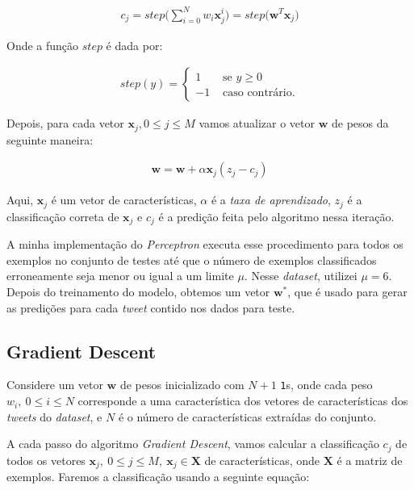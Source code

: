 \documentclass[a4paper, 12pt]{article}
\begin{document}
\begin{align*}
    c_j = step\bigg(\sum_{i = 0}^{N}{w_i\boldsymbol{x}_{j}^{i}}\bigg) = step\bigg(\boldsymbol{w}^{T}\boldsymbol{x}_j\bigg)
\end{align*}

Onde a função $step$ é dada por:

\begin{align*}
    step(y) = \begin{cases}
        1 & \text{ se } y \geq 0 \\
        -1 & \text{ caso contrário.}
    \end{cases}
\end{align*}

Depois, para cada vetor $\boldsymbol{x}_j, 0 \leq j \leq M$ vamos atualizar o vetor
$\boldsymbol{w}$ de pesos da seguinte maneira:

\begin{align*}
    \boldsymbol{w} = \boldsymbol{w} + \alpha\boldsymbol{x}_j(z_j - c_j)
\end{align*}

Aqui, $\boldsymbol{x}_j$ é um vetor de características, $\alpha$ é a
\textit{taxa de aprendizado}, $z_j$ é a classificação correta de
$\boldsymbol{x}_j$ e $c_j$ é a predição feita pelo algoritmo nessa iteração.

A minha implementação do \textit{Perceptron} executa esse procedimento para
todos os exemplos no conjunto de testes até que o número de exemplos
classificados erroneamente seja menor ou igual a um limite $\mu$. Nesse
\textit{dataset}, utilizei $\mu = 6$. Depois do treinamento do modelo, obtemos
um vetor $\boldsymbol{w}^{*}$, que é usado para gerar as predições para cada \textit{tweet}
contido nos dados para teste.

\subsection{Gradient Descent} \label{sec:gd}

Considere um vetor $\boldsymbol{w}$ de pesos inicializado
com $N + 1$ \texttt{1}s, onde cada peso $w_i,\: 0 \leq i \leq N$
corresponde a uma característica dos vetores de características
dos \textit{tweets} do \textit{dataset}, e $N$ é o número
de características extraídas do conjunto.

A cada passo do algoritmo \textit{Gradient Descent}, vamos calcular a
classificação $c_j$ de todos os vetores $\boldsymbol{x}_j,\: 0 \leq j \leq M,\: \boldsymbol{x}_j \in
\boldsymbol{X}$ de características, onde $\boldsymbol{X}$ é a matriz
de exemplos. Faremos a classificação usando a seguinte equação:
\end{document}
